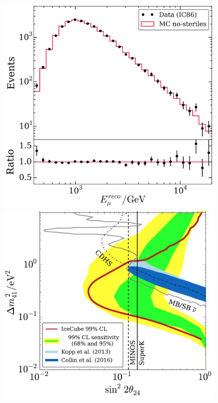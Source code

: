 \begin{figure}[htbp]
\begin{minipage}[c]{.46\linewidth}
   	      \includegraphics[width=0.9\linewidth]{figures/EnergyDist-2.png}
   \end{minipage} \hfill
   \begin{minipage}{.46\linewidth}
      \includegraphics[width=0.9\linewidth]{figures/icecube-sterile-crop.pdf}
   \end{minipage}

\end{figure}

